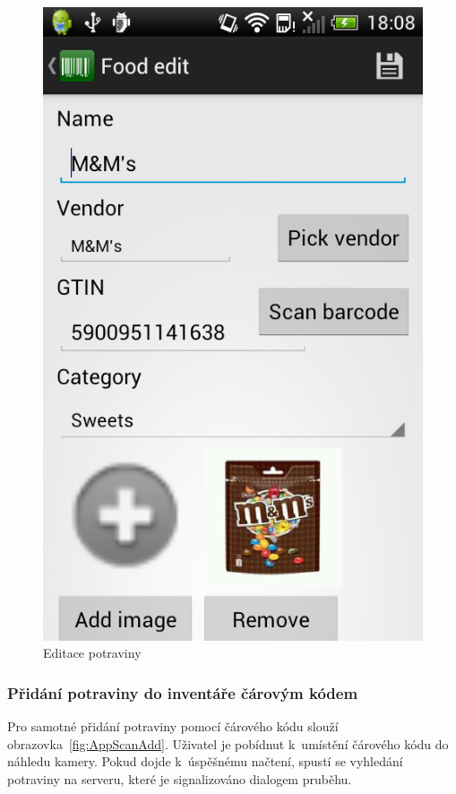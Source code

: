 \documentclass[thesis=B,czech]{FITthesis}[2013/10/20]
\begin{document}
\begin{figure}[H]
  \centering
  \includegraphics[scale=0.35]{screenshots/app_food_edit.png}
  \caption{Editace potraviny}
  \label{fig:AppFoodEdit}
\end{figure}

\clearpage

\subsubsection{Přidání potraviny do inventáře čárovým kódem}

Pro samotné přidání potraviny pomocí čárového kódu slouží obrazovka~\ref{fig:AppScanAdd}. Uživatel je pobídnut k~umístění čárového kódu do náhledu kamery. Pokud dojde k~úspěšnému načtení, spustí se vyhledání potraviny na serveru, které je signalizováno dialogem pruběhu.
\end{document}
